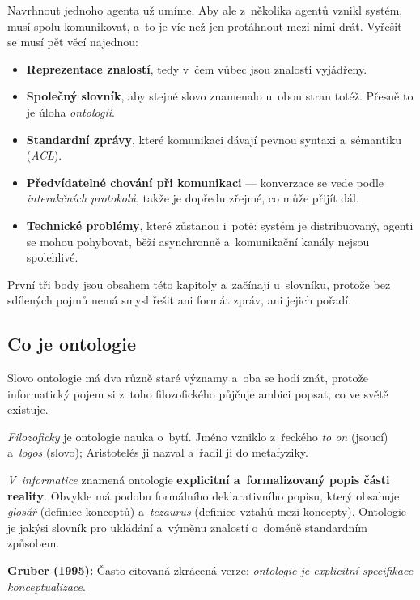 \documentclass[11pt,a4paper]{article}
\theoremstyle{definition}
\begin{document}
Navrhnout jednoho agenta už umíme. Aby ale z~několika agentů vznikl systém, musí spolu
komunikovat, a~to je víc než jen protáhnout mezi nimi drát. Vyřešit se musí pět věcí najednou:

\begin{itemize}
\item \textbf{Reprezentace znalostí}, tedy v~čem vůbec jsou znalosti vyjádřeny.
\item \textbf{Společný slovník}, aby stejné slovo znamenalo u~obou stran totéž. Přesně to je
  úloha \emph{ontologií}.
\item \textbf{Standardní zprávy}, které komunikaci dávají pevnou syntaxi a~sémantiku
  (\emph{ACL}).
\item \textbf{Předvídatelné chování při komunikaci} --- konverzace se vede podle
  \emph{interakčních protokolů}, takže je dopředu zřejmé, co může přijít dál.
\item \textbf{Technické problémy}, které zůstanou i~poté: systém je distribuovaný, agenti se
  mohou pohybovat, běží asynchronně a~komunikační kanály nejsou spolehlivé.
\end{itemize}

První tři body jsou obsahem této kapitoly a~začínají u~slovníku, protože bez sdílených pojmů
nemá smysl řešit ani formát zpráv, ani jejich pořadí.

\subsection{Co je ontologie}

Slovo ontologie má dva různě staré významy a~oba se hodí znát, protože informatický pojem si
z~toho filozofického půjčuje ambici popsat, co ve světě existuje.

\begin{defbox}[Ontologie]
\emph{Filozoficky} je ontologie nauka o~bytí. Jméno vzniklo z~řeckého \emph{to on} (jsoucí)
a~\emph{logos} (slovo); Aristotelés ji nazval  a~řadil ji do metafyziky.

\emph{V~informatice} znamená ontologie \textbf{explicitní a~formalizovaný popis části reality}.
Obvykle má podobu formálního deklarativního popisu, který obsahuje \emph{glosář} (definice
konceptů) a~\emph{tezaurus} (definice vztahů mezi koncepty). Ontologie je jakýsi slovník pro
ukládání a~výměnu znalostí o~doméně standardním způsobem.

\textbf{Gruber (1995):} 
Často citovaná zkrácená verze: \emph{ontologie je explicitní specifikace konceptualizace}.
\end{defbox}
\end{document}

